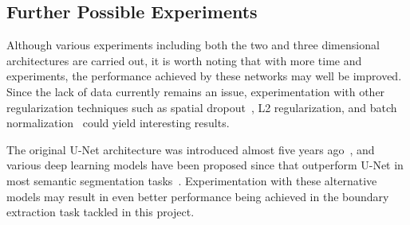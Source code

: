 \subsection{Further Possible Experiments}

Although various experiments including both the two and three dimensional architectures are carried out, it is worth noting that with more time and experiments, the performance achieved by these networks may well be improved. Since the lack of data currently remains an issue, experimentation with other regularization techniques such as spatial dropout~\cite{spatial}, L2 regularization, and batch normalization~\cite{batchnorm} could yield interesting results.

The original U-Net architecture was introduced almost five years ago~\cite{ronneberger2015u}, and various deep learning models have been proposed since that outperform U-Net in most semantic segmentation tasks~\cite{chen2018encoder, semanticseg-SOTA}. Experimentation with these alternative models may result in even better performance being achieved in the boundary extraction task tackled in this project.





